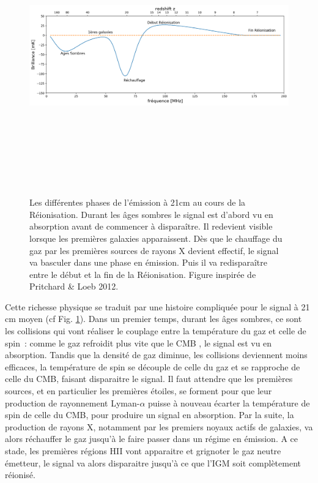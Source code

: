 \begin{figure}[htbp]
	\centering
		\includegraphics[height=12cm]{figs/21cm.png}
		\caption[L'histoire du signal à 21cm de la Réionisation]{Les différentes phases de l'émission à 21cm au cours de la Réionisation. Durant les âges sombres le signal est d'abord vu en absorption avant de commencer à disparaître. Il redevient visible lorsque les premières galaxies apparaissent. Dès que le chauffage du gaz par les premières sources de rayons X devient effectif, le signal va basculer dans une phase en émission. Puis il va redisparaître entre le début et la fin de la Réionisation. Figure inspirée de Pritchard \& Loeb 2012.}
	\label{f:21cm}
\end{figure} 

Cette richesse physique se traduit par une histoire compliquée pour le signal à 21 cm moyen (cf Fig. \ref{f:21cm}). Dans un premier temps, durant les âges sombres, ce sont les collisions qui vont réaliser le couplage entre la température du gaz et celle de spin~: comme le gaz refroidit plus vite que le CMB , le signal est vu en absorption. Tandis que la densité de gaz diminue, les collisions deviennent moins efficaces, la température de spin se découple de celle du gaz et se rapproche de celle du CMB, faisant disparaitre le signal. Il faut attendre que les premières sources, et en particulier les premières étoiles, se forment pour que leur production de rayonnement Lyman-$\alpha$ puisse à nouveau écarter la température de spin de celle du CMB, pour produire un signal en absorption. Par la suite, la production de rayons X, notamment par les premiers noyaux actifs de galaxies, va alors réchauffer le gaz jusqu'à le faire passer dans un régime en émission. A ce stade, les premières régions HII vont apparaitre et grignoter le gaz neutre émetteur, le signal va alors disparaitre jusqu'à ce que l'IGM soit complètement réionisé.

